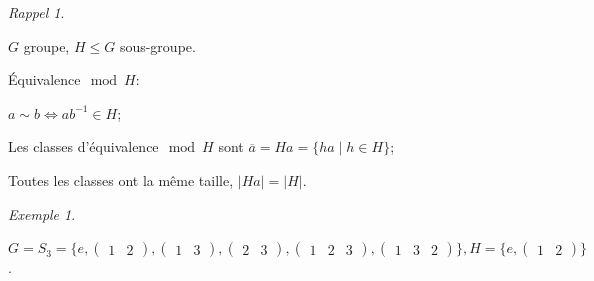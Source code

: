 \documentclass{report}
\newcommand*{\card}[1]{\left| #1 \right|}
\newcommand*{\lte}{\leqslant}
\theoremstyle{definition}
\theoremstyle{remark}
\newtheorem*{exem}{Exemple}
\newtheorem*{rappel}{Rappel}
\begin{document}
	
	\begin{rappel}~

		$G$ groupe, $H \lte G$ sous-groupe.
		\begin{ulist}
			\item \'Equivalence$\mod H$:

			$a \sim b \Leftrightarrow ab^{-1} \in H$;
			\item Les  classes d'\'equivalence$\mod H$ sont $\overline{a} = Ha = \{ha \mid h \in H\}$;
			\item Toutes les classes ont la m\^eme taille, $\card{Ha} = \card{H}$.
		\end{ulist}
	\end{rappel}
	\begin{exem}~

		$G = S_3 = \{e, \begin{pmatrix}
			1&2
		\end{pmatrix}, \begin{pmatrix}
			1&3
		\end{pmatrix}, \begin{pmatrix}
			2&3
		\end{pmatrix}, \begin{pmatrix}
			1&2&3
		\end{pmatrix}, \begin{pmatrix}
			1&3&2
		\end{pmatrix}\}, H = \{e, \begin{pmatrix}
			1&2
		\end{pmatrix}\}$.


\end{exem}
\end{document}

